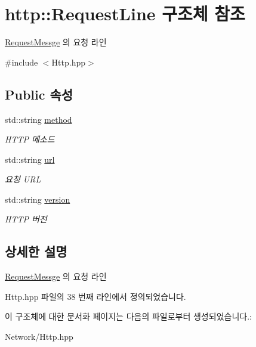 \hypertarget{structhttp_1_1_request_line}{}\section{http\+:\+:Request\+Line 구조체 참조}
\label{structhttp_1_1_request_line}


\hyperlink{classhttp_1_1_request_messge}{Request\+Messge} 의 요청 라인  




{\ttfamily \#include $<$Http.\+hpp$>$}

\subsection*{Public 속성}
\begin{DoxyCompactItemize}
\item 
\mbox{\label{structhttp_1_1_request_line_a8e4f504c2b7163ddb26d3a44dfb24473}} 
std\+::string \hyperlink{structhttp_1_1_request_line_a8e4f504c2b7163ddb26d3a44dfb24473}{method}
\begin{DoxyCompactList}\small\item\em H\+T\+TP 메소드 \end{DoxyCompactList}\item 
\mbox{\label{structhttp_1_1_request_line_a1fe6a360ed5a98357163c0e42db12212}} 
std\+::string \hyperlink{structhttp_1_1_request_line_a1fe6a360ed5a98357163c0e42db12212}{url}
\begin{DoxyCompactList}\small\item\em 요청 U\+RL \end{DoxyCompactList}\item 
\mbox{\label{structhttp_1_1_request_line_a4504aa991c66f74b21861efa10dab31f}} 
std\+::string \hyperlink{structhttp_1_1_request_line_a4504aa991c66f74b21861efa10dab31f}{version}
\begin{DoxyCompactList}\small\item\em H\+T\+TP 버전 \end{DoxyCompactList}\end{DoxyCompactItemize}


\subsection{상세한 설명}
\hyperlink{classhttp_1_1_request_messge}{Request\+Messge} 의 요청 라인 

Http.\+hpp 파일의 38 번째 라인에서 정의되었습니다.



이 구조체에 대한 문서화 페이지는 다음의 파일로부터 생성되었습니다.\+:\begin{DoxyCompactItemize}
\item 
Network/Http.\+hpp\end{DoxyCompactItemize}
